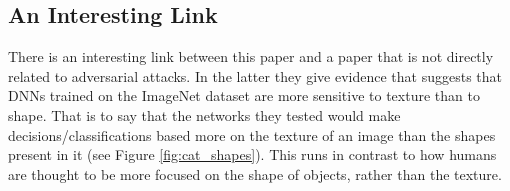 \documentclass{article}
\begin{document}


\subsection{An Interesting Link}
There is an interesting link between this paper and a paper \cite{geirhos2018imagenet} that is not directly related to adversarial attacks. In the latter they give evidence that suggests that DNNs trained on the ImageNet dataset are more sensitive to texture than to shape. That is to say that the networks they tested would make decisions/classifications based more on the texture of an image than the shapes present in it (see Figure \ref{fig:cat_shapes}). This runs in contrast to how humans are thought to be more focused on the shape of objects, rather than the texture. 
\end{document}
